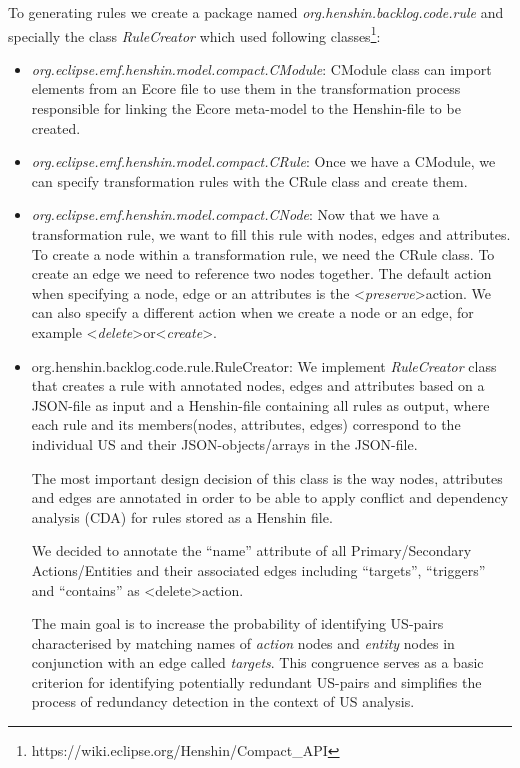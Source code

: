 To generating rules we create a package named \textit{org.henshin.backlog.code.rule} and specially the class \textit{RuleCreator} which used following classes\footnote{https://wiki.eclipse.org/Henshin/Compact\_API}\label{compact_api}:
\begin{itemize}
\item \textit{org.eclipse.emf.henshin.model.compact.CModule}: CModule class can import elements from an Ecore file to use them in the transformation process responsible for linking the Ecore meta-model to the Henshin-file to be created.
\item \textit{org.eclipse.emf.henshin.model.compact.CRule}: Once we have a CModule, we can specify transformation rules with the CRule class and create them.
\item \textit{org.eclipse.emf.henshin.model.compact.CNode}: Now that we have a transformation rule, we want to fill this rule with nodes, edges and attributes. To create a node within a transformation rule, we need the CRule class. To create an edge we need to reference two nodes together. The default action when specifying a node, edge or an attributes is the \textless\emph{preserve}\textgreater action. We can also specify a different action when we create a node or an edge, for example \textless\emph{delete}\textgreater or\textless\emph{create}\textgreater.
\item org.henshin.backlog.code.rule.RuleCreator: We implement \textit{RuleCreator} class that creates a rule with annotated nodes, edges and attributes based on a JSON-file as input and a Henshin-file containing all rules as output, where each rule and its members(nodes, attributes, edges) correspond to the individual US and their JSON-objects/arrays in the JSON-file. 

The most important design decision of this class is the way nodes, attributes and edges are annotated in order to be able to apply conflict and dependency analysis (CDA) for rules stored as a Henshin file.

We decided to annotate the \enquote{name} attribute of all Primary/Secondary Actions/Entities and their associated edges including \enquote{targets}, \enquote{triggers} and \enquote{contains} as \textless delete\textgreater action. 

The main goal is to increase the probability of identifying US-pairs characterised by matching names of \textit{action} nodes and \textit{entity} nodes in conjunction with an edge called \textit{targets}. This congruence serves as a basic criterion for identifying potentially redundant US-pairs and simplifies the process of redundancy detection in the context of US analysis.
\end{itemize}
